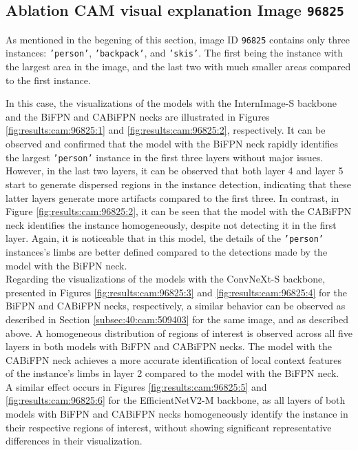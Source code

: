 \subsection{Ablation CAM visual explanation Image \texttt{96825}}\label{subsec:40:cam:96825}
As mentioned in the begening of this section, image ID \texttt{96825} contains only three instances: \texttt{'person'}, \texttt{'backpack'}, and \texttt{'skis'}. The first being the instance with the largest area in the image, and the last two with much smaller areas compared to the first instance.

In this case, the visualizations of the models with the InternImage-S backbone and the BiFPN and CABiFPN necks are illustrated in Figures \ref{fig:results:cam:96825:1} and \ref{fig:results:cam:96825:2}, respectively. It can be observed and confirmed that the model with the BiFPN neck rapidly identifies the largest \texttt{'person'} instance in the first three layers without major issues. However, in the last two layers, it can be observed that both layer 4 and layer 5 start to generate dispersed regions in the instance detection, indicating that these latter layers generate more artifacts compared to the first three. In contrast, in Figure \ref{fig:results:cam:96825:2}, it can be seen that the model with the CABiFPN neck identifies the instance homogeneously, despite not detecting it in the first layer. Again, it is noticeable that in this model, the details of the \texttt{'person'} instances's limbs are better defined compared to the detections made by the model with the BiFPN neck.\\

Regarding the visualizations of the models with the ConvNeXt-S backbone, presented in Figures \ref{fig:results:cam:96825:3} and \ref{fig:results:cam:96825:4} for the BiFPN and CABiFPN necks, respectively, a similar behavior can be observed as described in Section \ref{subsec:40:cam:509403} for the same image, and as described above. A homogeneous distribution of regions of interest is observed across all five layers in both models with BiFPN and CABiFPN necks. The model with the CABiFPN neck achieves a more accurate identification of local context features of the instance's limbs in layer 2 compared to the model with the BiFPN neck.\\

A similar effect occurs in Figures \ref{fig:results:cam:96825:5} and \ref{fig:results:cam:96825:6} for the EfficientNetV2-M backbone, as all layers of both models with BiFPN and CABiFPN necks homogeneously identify the instance in their respective regions of interest, without showing significant representative differences in their visualization.

